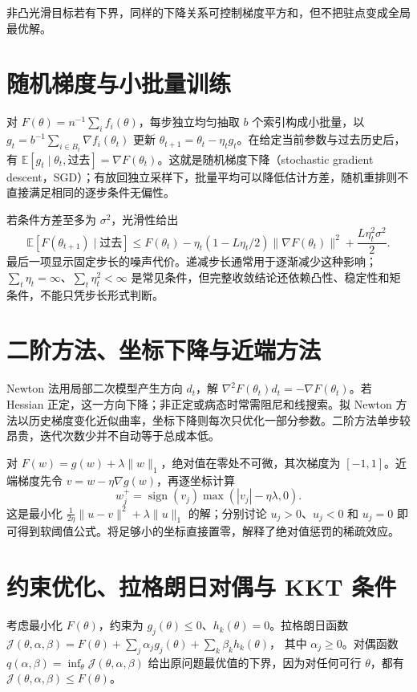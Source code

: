 非凸光滑目标若有下界，同样的下降关系可控制梯度平方和，但不把驻点变成全局最优解。

\section{随机梯度与小批量训练}

对 $F(\theta)=n^{-1}\sum_i f_i(\theta)$，每步独立均匀抽取 $b$ 个索引构成小批量，以 $g_t=b^{-1}\sum_{i\in B_t}\nabla f_i(\theta_t)$ 更新 $\theta_{t+1}=\theta_t-\eta_tg_t$。在给定当前参数与过去历史后，有 $\mathbb E[g_t\mid\theta_t,\text{过去}]=\nabla F(\theta_t)$。这就是随机梯度下降（stochastic gradient descent，SGD）；有放回独立采样下，批量平均可以降低估计方差，随机重排则不直接满足相同的逐步条件无偏性。

若条件方差至多为 $\sigma^2$，光滑性给出
\[
 \mathbb E[F(\theta_{t+1})\mid\text{过去}]
 \leq F(\theta_t)-\eta_t(1-L\eta_t/2)\|\nabla F(\theta_t)\|^2
 +\frac{L\eta_t^2\sigma^2}{2}.
\]
最后一项显示固定步长的噪声代价。递减步长通常用于逐渐减少这种影响；$\sum_t\eta_t=\infty$、$\sum_t\eta_t^2<\infty$ 是常见条件，但完整收敛结论还依赖凸性、稳定性和矩条件，不能只凭步长形式判断。

\section{二阶方法、坐标下降与近端方法}

Newton 法用局部二次模型产生方向 $d_t$，解 $\nabla^2F(\theta_t)d_t=-\nabla F(\theta_t)$。若 Hessian 正定，这一方向下降；非正定或病态时常需阻尼和线搜索。拟 Newton 方法以历史梯度变化近似曲率，坐标下降则每次只优化一部分参数。二阶方法单步较昂贵，迭代次数少并不自动等于总成本低。

对 $F(w)=g(w)+\lambda\|w\|_1$，绝对值在零处不可微，其次梯度为 $[-1,1]$。近端梯度先令 $v=w-\eta\nabla g(w)$，再逐坐标计算
\begin{equation}
 w_j^{+}=\operatorname{sign}(v_j)\max(|v_j|-\eta\lambda,0).
 \label{eq:ml-soft-threshold}
\end{equation}
这是最小化 $\frac1{2\eta}\|u-v\|^2+\lambda\|u\|_1$ 的解；分别讨论 $u_j>0$、$u_j<0$ 和 $u_j=0$ 即可得到软阈值公式。将足够小的坐标直接置零，解释了绝对值惩罚的稀疏效应。

\section{约束优化、拉格朗日对偶与 KKT 条件}

考虑最小化 $F(\theta)$，约束为 $g_j(\theta)\leq0$、$h_k(\theta)=0$。拉格朗日函数
$\mathcal J(\theta,\alpha,\beta)=F(\theta)+\sum_j\alpha_jg_j(\theta)+\sum_k\beta_kh_k(\theta)$，
其中 $\alpha_j\geq0$。对偶函数 $q(\alpha,\beta)=\inf_\theta\mathcal J(\theta,\alpha,\beta)$ 给出原问题最优值的下界，因为对任何可行 $\theta$，都有 $\mathcal J(\theta,\alpha,\beta)\leq F(\theta)$。

